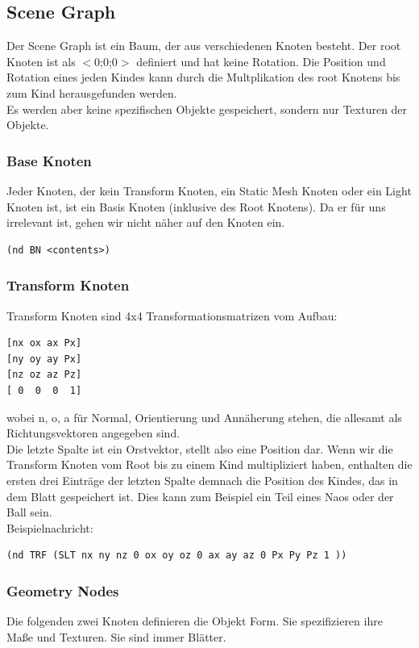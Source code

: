 \subsection*{Scene Graph}
Der Scene Graph ist ein Baum, der aus verschiedenen Knoten besteht. 
Der root Knoten ist als $<$0;0;0$>$ definiert und hat keine Rotation. 
Die Position und Rotation eines jeden Kindes kann durch die 
Multplikation des root Knotens bis zum Kind herausgefunden werden.\\
Es werden aber keine spezifischen Objekte gespeichert, sondern nur Texturen der Objekte.

\subsubsection*{Base Knoten}
Jeder Knoten, der kein Transform Knoten, ein Static Mesh Knoten oder 
ein Light Knoten ist, ist ein Basis Knoten (inklusive des Root Knotens).
 Da er für uns irrelevant ist, gehen wir nicht näher auf den Knoten ein.

\begin{verbatim}(nd BN <contents>)
\end{verbatim}
\subsubsection*{Transform Knoten}
Transform Knoten sind 4x4 Transformationsmatrizen vom Aufbau:

\begin{verbatim}
[nx ox ax Px]
[ny oy ay Px]
[nz oz az Pz]
[ 0  0  0  1]
\end{verbatim}
wobei n, o, a für Normal, Orientierung und Annäherung stehen, die allesamt als Richtungsvektoren angegeben sind.\\
Die letzte Spalte ist ein Orstvektor, stellt also eine Position 
dar.
Wenn wir die Transform Knoten vom Root bis zu einem Kind multipliziert 
haben, enthalten die ersten drei Einträge der letzten Spalte demnach die
 Position des Kindes, das in dem Blatt gespeichert ist. Dies kann zum 
Beispiel ein Teil eines Naos oder der Ball sein.\\
Beispielnachricht:

\begin{verbatim}(nd TRF (SLT nx ny nz 0 ox oy oz 0 ax ay az 0 Px Py Pz 1 ))
\end{verbatim}
\subsubsection*{Geometry Nodes}
Die folgenden zwei Knoten definieren die Objekt Form. Sie spezifizieren ihre Maße und Texturen. Sie sind immer Blätter.

